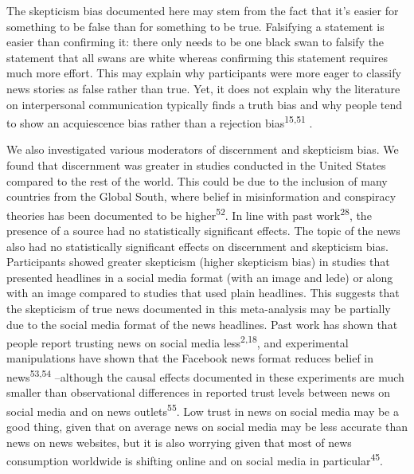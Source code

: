 \documentclass[
  doc,floatsintext]{apa6}
\begin{document}
The skepticism bias documented here may stem from the fact that it's easier for something to be false than for something to be true. Falsifying a statement is easier than confirming it: there only needs to be one black swan to falsify the statement that all swans are white whereas confirming this statement requires much more effort. This may explain why participants were more eager to classify news stories as false rather than true. Yet, it does not explain why the literature on interpersonal communication typically finds a truth bias and why people tend to show an acquiescence bias rather than a rejection bias\textsuperscript{15,51} .

We also investigated various moderators of discernment and skepticism bias. We found that discernment was greater in studies conducted in the United States compared to the rest of the world. This could be due to the inclusion of many countries from the Global South, where belief in misinformation and conspiracy theories has been documented to be higher\textsuperscript{52}. In line with past work\textsuperscript{28}, the presence of a source had no statistically significant effects. The topic of the news also had no statistically significant effects on discernment and skepticism bias. Participants showed greater skepticism (higher skepticism bias) in studies that presented headlines in a social media format (with an image and lede) or along with an image compared to studies that used plain headlines. This suggests that the skepticism of true news documented in this meta-analysis may be partially due to the social media format of the news headlines. Past work has shown that people report trusting news on social media less\textsuperscript{2,18}, and experimental manipulations have shown that the Facebook news format reduces belief in news\textsuperscript{53,54} --although the causal effects documented in these experiments are much smaller than observational differences in reported trust levels between news on social media and on news outlets\textsuperscript{55}. Low trust in news on social media may be a good thing, given that on average news on social media may be less accurate than news on news websites, but it is also worrying given that most of news consumption worldwide is shifting online and on social media in particular\textsuperscript{45}.
\end{document}
